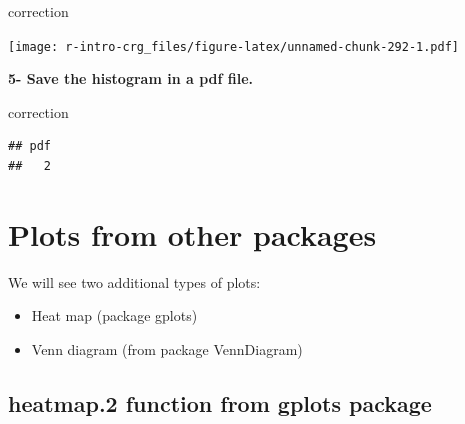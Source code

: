 \documentclass[]{book}
\newenvironment{Shaded}{\begin{snugshade}}{\end{snugshade}}
\newcommand{\DataTypeTok}[1]{\textcolor[rgb]{0.13,0.29,0.53}{#1}}
\newcommand{\DecValTok}[1]{\textcolor[rgb]{0.00,0.00,0.81}{#1}}
\newcommand{\KeywordTok}[1]{\textcolor[rgb]{0.13,0.29,0.53}{\textbf{#1}}}
\newcommand{\NormalTok}[1]{#1}
\newcommand{\OperatorTok}[1]{\textcolor[rgb]{0.81,0.36,0.00}{\textbf{#1}}}
\newcommand{\StringTok}[1]{\textcolor[rgb]{0.31,0.60,0.02}{#1}}
\providecommand{\tightlist}{%
  \setlength{\itemsep}{0pt}\setlength{\parskip}{0pt}}
\begin{document}
correction

\begin{Shaded}
\end{Shaded}

\texttt{[image: r-intro-crg\_files/figure-latex/unnamed-chunk-292-1.pdf]}

\textbf{5- Save the histogram in a pdf file.}

correction

\begin{Shaded}
\end{Shaded}

\begin{verbatim}
## pdf 
##   2
\end{verbatim}

\hypertarget{plots-from-other-packages}{%
\chapter{Plots from other packages}\label{plots-from-other-packages}}

We will see two additional types of plots:

\begin{itemize}
\tightlist
\item
  Heat map (package gplots)
\item
  Venn diagram (from package VennDiagram)
\end{itemize}

\hypertarget{heatmap.2-function-from-gplots-package}{%
\section{heatmap.2 function from gplots package}\label{heatmap.2-function-from-gplots-package}}
\end{document}
